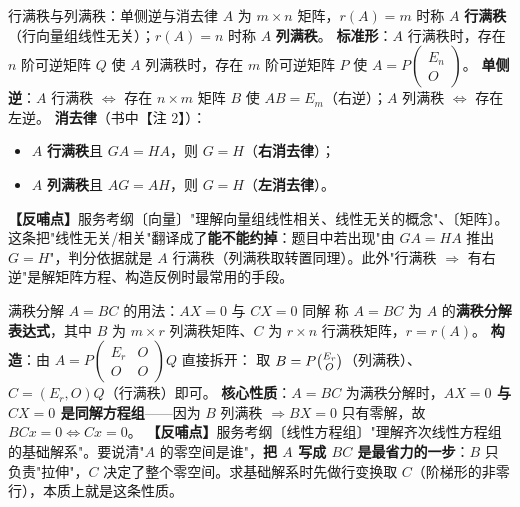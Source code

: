 \begin{fdeep}{行满秩与列满秩：单侧逆与消去律}
$A$ 为 $m\times n$ 矩阵，$r(A)=m$ 时称 $A$ \textbf{行满秩}（行向量组线性无关）；$r(A)=n$ 时称 $A$ \textbf{列满秩}。
\textbf{标准形}：$A$ 行满秩时，存在 $n$ 阶可逆矩阵 $Q$ 使
$A$ 列满秩时，存在 $m$ 阶可逆矩阵 $P$ 使 $A=P\begin{pmatrix}E_n\\ O\end{pmatrix}$。
\textbf{单侧逆}：$A$ 行满秩 $\iff$ 存在 $n\times m$ 矩阵 $B$ 使 $AB=E_m$（右逆）；$A$ 列满秩 $\iff$ 存在左逆。
\textbf{消去律}（书中【注 2】）：
\begin{itemize}[leftmargin=2.2em,itemsep=0.22em]
\item $A$ \textbf{行满秩}且 $GA=HA$，则 $G=H$（\textbf{右消去律}）；
\item $A$ \textbf{列满秩}且 $AG=AH$，则 $G=H$（\textbf{左消去律}）。
\end{itemize}
\textbf{【反哺点】}服务考纲〔向量〕"理解向量组线性相关、线性无关的概念"、〔矩阵〕。这条把"线性无关/相关"翻译成了\textbf{能不能约掉}：题目中若出现"由 $GA=HA$ 推出 $G=H$"，判分依据就是 $A$ 行满秩（列满秩取转置同理）。此外"行满秩 $\Rightarrow$ 有右逆"是解矩阵方程、构造反例时最常用的手段。
\end{fdeep}


\begin{fdeep}{满秩分解 $A=BC$ 的用法：$AX=0$ 与 $CX=0$ 同解}
称 $A=BC$ 为 $A$ 的\textbf{满秩分解表达式}，其中 $B$ 为 $m\times r$ 列满秩矩阵、$C$ 为 $r\times n$ 行满秩矩阵，$r=r(A)$。
\textbf{构造}：由 $A=P\begin{pmatrix}E_r&O\\ O&O\end{pmatrix}Q$ 直接拆开：
取 $B=P\tbinom{E_r}{O}$（列满秩）、$C=(E_r,O)Q$（行满秩）即可。
\textbf{核心性质}：$A=BC$ 为满秩分解时，\textbf{$AX=0$ 与 $CX=0$ 是同解方程组}——因为 $B$ 列满秩 $\Rightarrow BX=0$ 只有零解，故 $BCx=0\iff Cx=0$。
\textbf{【反哺点】}服务考纲〔线性方程组〕"理解齐次线性方程组的基础解系"。要说清"$A$ 的零空间是谁"，\textbf{把 $A$ 写成 $BC$ 是最省力的一步}：$B$ 只负责"拉伸"，$C$ 决定了整个零空间。求基础解系时先做行变换取 $C$（阶梯形的非零行），本质上就是这条性质。
\end{fdeep}


